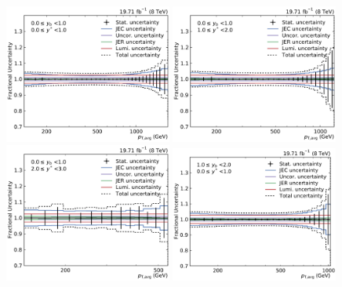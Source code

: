 
\begin{figure}[htbp]
    \centering
    \includegraphics[width=0.49\textwidth]{figures/measurement/exp_unc_overview_yb0ys0.pdf}\hfill
    \includegraphics[width=0.49\textwidth]{figures/measurement/exp_unc_overview_yb0ys1.pdf}
    \includegraphics[width=0.49\textwidth]{figures/measurement/exp_unc_overview_yb0ys2.pdf}\hfill
    \includegraphics[width=0.49\textwidth]{figures/measurement/exp_unc_overview_yb1ys0.pdf}

\end{figure}
